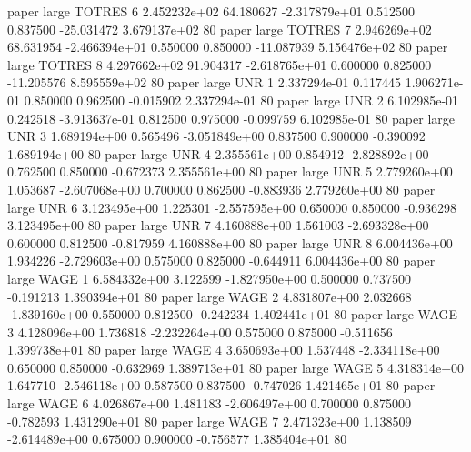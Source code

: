               paper      large   TOTRES                 6 2.452232e+02     64.180627 -2.317879e+01 0.512500 0.837500     -25.031472 3.679137e+02 80
              paper      large   TOTRES                 7 2.946269e+02     68.631954 -2.466394e+01 0.550000 0.850000     -11.087939 5.156476e+02 80
              paper      large   TOTRES                 8 4.297662e+02     91.904317 -2.618765e+01 0.600000 0.825000     -11.205576 8.595559e+02 80
              paper      large      UNR                 1 2.337294e-01      0.117445  1.906271e-01 0.850000 0.962500      -0.015902 2.337294e-01 80
              paper      large      UNR                 2 6.102985e-01      0.242518 -3.913637e-01 0.812500 0.975000      -0.099759 6.102985e-01 80
              paper      large      UNR                 3 1.689194e+00      0.565496 -3.051849e+00 0.837500 0.900000      -0.390092 1.689194e+00 80
              paper      large      UNR                 4 2.355561e+00      0.854912 -2.828892e+00 0.762500 0.850000      -0.672373 2.355561e+00 80
              paper      large      UNR                 5 2.779260e+00      1.053687 -2.607068e+00 0.700000 0.862500      -0.883936 2.779260e+00 80
              paper      large      UNR                 6 3.123495e+00      1.225301 -2.557595e+00 0.650000 0.850000      -0.936298 3.123495e+00 80
              paper      large      UNR                 7 4.160888e+00      1.561003 -2.693328e+00 0.600000 0.812500      -0.817959 4.160888e+00 80
              paper      large      UNR                 8 6.004436e+00      1.934226 -2.729603e+00 0.575000 0.825000      -0.644911 6.004436e+00 80
              paper      large     WAGE                 1 6.584332e+00      3.122599 -1.827950e+00 0.500000 0.737500      -0.191213 1.390394e+01 80
              paper      large     WAGE                 2 4.831807e+00      2.032668 -1.839160e+00 0.550000 0.812500      -0.242234 1.402441e+01 80
              paper      large     WAGE                 3 4.128096e+00      1.736818 -2.232264e+00 0.575000 0.875000      -0.511656 1.399738e+01 80
              paper      large     WAGE                 4 3.650693e+00      1.537448 -2.334118e+00 0.650000 0.850000      -0.632969 1.389713e+01 80
              paper      large     WAGE                 5 4.318314e+00      1.647710 -2.546118e+00 0.587500 0.837500      -0.747026 1.421465e+01 80
              paper      large     WAGE                 6 4.026867e+00      1.481183 -2.606497e+00 0.700000 0.875000      -0.782593 1.431290e+01 80
              paper      large     WAGE                 7 2.471323e+00      1.138509 -2.614489e+00 0.675000 0.900000      -0.756577 1.385404e+01 80
